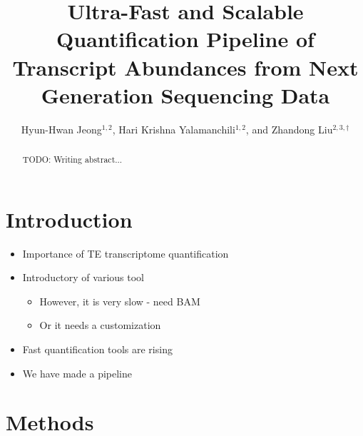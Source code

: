 \documentclass{ws-procs11x85}
\begin{document}
\title{Ultra-Fast and Scalable Quantification Pipeline of Transcript Abundances from Next Generation Sequencing Data}

\author{Hyun-Hwan Jeong$^{1,2}$, Hari Krishna Yalamanchili$^{1,2}$, and Zhandong Liu$^{2,3,\dag}$}

\address{$^{1}$Department of Molecular and Human Genetics, Baylor College of Medicine,\\
$^{2}$Jan and Dan Duncan Neurological Research Institute, Texas Children’s Hospital,\\
$^{3}$Department of Pediatrics, Baylor College of Medicine,\\
Houston, Texas 77030, USA\\
$^{\dag}$E-mail: zhandonl@bcm.edu}

\begin{abstract}
TODO: Writing abstract...
\end{abstract}



\bodymatter

\section{Introduction}\label{aba:intro}

\begin{itemize}
\item Importance of TE transcriptome quantification
\item Introductory of various tool
	\begin{itemize}
    \item However, it is very slow - need BAM
    \item Or it needs a customization
    \end{itemize}
\item Fast quantification tools are rising
\item We have made a pipeline
\end{itemize}


\section{Methods}
\end{document}
